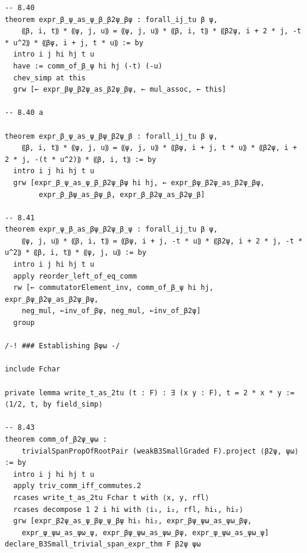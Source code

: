 \documentclass[10pt,a4paper]{article}
\begin{document}
\begin{Verbatim}
-- 8.40
theorem expr_β_ψ_as_ψ_β_β2ψ_βψ : forall_ij_tu β ψ,
    ⸨β, i, t⸩ * ⸨ψ, j, u⸩ = ⸨ψ, j, u⸩ * ⸨β, i, t⸩ * ⸨β2ψ, i + 2 * j, -t * u^2⸩ * ⸨βψ, i + j, t * u⸩ := by
  intro i j hi hj t u
  have := comm_of_β_ψ hi hj (-t) (-u)
  chev_simp at this
  grw [← expr_βψ_β2ψ_as_β2ψ_βψ, ← mul_assoc, ← this]

-- 8.40 a

theorem expr_β_ψ_as_ψ_βψ_β2ψ_β : forall_ij_tu β ψ,
    ⸨β, i, t⸩ * ⸨ψ, j, u⸩ = ⸨ψ, j, u⸩ * ⸨βψ, i + j, t * u⸩ * ⸨β2ψ, i + 2 * j, -(t * u^2)⸩ * ⸨β, i, t⸩ := by
  intro i j hi hj t u
  grw [expr_β_ψ_as_ψ_β_β2ψ_βψ hi hj, ← expr_βψ_β2ψ_as_β2ψ_βψ,
        expr_β_βψ_as_βψ_β, expr_β_β2ψ_as_β2ψ_β]

-- 8.41
theorem expr_ψ_β_as_βψ_β2ψ_β_ψ : forall_ij_tu β ψ,
    ⸨ψ, j, u⸩ * ⸨β, i, t⸩ = ⸨βψ, i + j, -t * u⸩ * ⸨β2ψ, i + 2 * j, -t * u^2⸩ * ⸨β, i, t⸩ * ⸨ψ, j, u⸩ := by
  intro i j hi hj t u
  apply reorder_left_of_eq_comm
  rw [← commutatorElement_inv, comm_of_β_ψ hi hj, expr_βψ_β2ψ_as_β2ψ_βψ,
    neg_mul, ←inv_of_βψ, neg_mul, ←inv_of_β2ψ]
  group

/-! ### Establishing βψω -/

include Fchar

private lemma write_t_as_2tu (t : F) : ∃ (x y : F), t = 2 * x * y := ⟨1/2, t, by field_simp⟩

-- 8.43
theorem comm_of_β2ψ_ψω :
    trivialSpanPropOfRootPair (weakB3SmallGraded F).project ⟨β2ψ, ψω⟩ := by
  intro i j hi hj t u
  apply triv_comm_iff_commutes.2
  rcases write_t_as_2tu Fchar t with ⟨x, y, rfl⟩
  rcases decompose 1 2 i hi with ⟨i₁, i₂, rfl, hi₁, hi₂⟩
  grw [expr_β2ψ_as_ψ_βψ_ψ_βψ hi₁ hi₂, expr_βψ_ψω_as_ψω_βψ,
    expr_ψ_ψω_as_ψω_ψ, expr_βψ_ψω_as_ψω_βψ, expr_ψ_ψω_as_ψω_ψ]
declare_B3Small_trivial_span_expr_thm F β2ψ ψω


\end{Verbatim}
\end{document}
